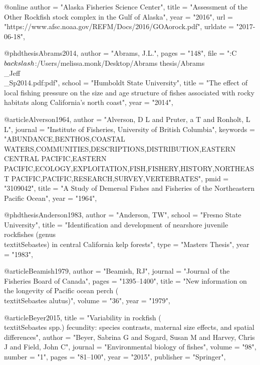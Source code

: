 @online{
    author = "{Alaska Fisheries Science Center}",
    title = "{{Assessment of the Other Rockfish stock complex in the Gulf of Alaska}}",
    year = "2016",
    url = "{https://www.afsc.noaa.gov/REFM/Docs/2016/GOAorock.pdf}",
    urldate = "{2017-06-18}",
}

@phdthesis{Abrams2014,
    author = "{Abrams, J.L.}",
    pages = "{148}",
    file = "{:C$\\backslash$:/Users/melissa.monk/Desktop/Abrams thesis/Abrams\\_Jeff\\_Sp2014.pdf:pdf}",
    school = "{Humboldt State University}",
    title = "{{The effect of local fishing pressure on the size and age structure of fishes associated with rocky habitats along California's north coast}}",
    year = "{2014}",
}

@article{Alverson1964,
    author = "{Alverson, D L and Pruter, a T and Ronholt, L L}",
    journal = "{Institute of Fisheries, University of British Columbia}",
    keywords = "{ABUNDANCE,BENTHOS,COASTAL WATERS,COMMUNITIES,DESCRIPTIONS,DISTRIBUTION,EASTERN CENTRAL PACIFIC,EASTERN PACIFIC,ECOLOGY,EXPLOITATION,FISH,FISHERY,HISTORY,NORTHEAST PACIFIC,PACIFIC,RESEARCH,SURVEY,VERTEBRATES}",
    pmid = "{3109042}",
    title = "{{A Study of Demersal Fishes and Fisheries of the Northeastern Pacific Ocean}}",
    year = "{1964}",
}

@phdthesis{Anderson1983,
    author = "{Anderson, TW}",
    school = "{Fresno State University}",
    title = "{{Identification and development of nearshore juvenile rockfishes (genus \\textit{{Sebastes}}) in central California kelp forests}}",
    type = "{Masters Thesis}",
    year = "{1983}",
}

@article{Beamish1979,
    author = "{Beamish, RJ}",
    journal = "{Journal of the Fisheries Board of Canada}",
    pages = "{1395--1400}",
    title = "{{New information on the longevity of Pacific ocean perch (\\textit{{Sebastes} alutus})}}",
    volume = "{36}",
    year = "{1979}",
}

@article{Beyer2015,
    title = "{Variability in rockfish (\\textit{{Sebastes}} spp.) fecundity: species contrasts, maternal size effects, and spatial differences}",
    author = "{Beyer, Sabrina G and Sogard, Susan M and Harvey, Chris J and Field, John C}",
    journal = "{Environmental biology of fishes}",
    volume = "{98}",
    number = "{1}",
    pages = "{81--100}",
    year = "{2015}",
    publisher = "{Springer}",
}

